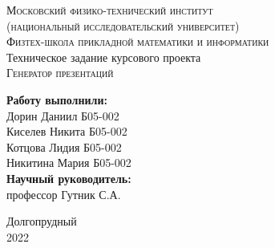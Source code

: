 



  \begin{titlepage}	%

    \thispagestyle{empty}
    \begin{center}		%
      \textsc{Московский физико-технический институт} \\
      \textsc{(национальный исследовательский университет)} \\
      \textsc{Физтех-школа прикладной математики и информатики} \\[6cm]

      \large Техническое задание курсового проекта \\
      \huge \textsc{Генератор презентаций} \\ 
    \end{center}

    \vfill

    \begin{flushright} %
      \begin{minipage}{0.45\textwidth} %
        \begin{flushleft} %

          \large\textbf{Работу выполнили:}\\
          \large Дорин Даниил Б05-002 \\
          \large Киселев Никита Б05-002 \\
          \large Котцова Лидия Б05-002 \\
          \large Никитина Мария Б05-002 \\

          \large \textbf{Научный руководитель:}\\
          \large профессор Гутник С.А.

        \end{flushleft}
      \end{minipage}
    \end{flushright}

    \vfill %

    \begin{center}
      \large Долгопрудный \\
      \large 2022 %
    \end{center} %

    \pagebreak

  \end{titlepage} %
  \newpage

